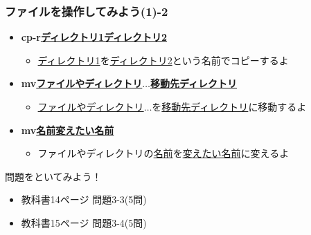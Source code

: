 \documentclass[slide03.tex]{subfiles}
\begin{document}
\begin{frame}
    \frametitle{ファイルを操作してみよう(1)-2}
    \begin{itemize}
        \item {\bf cp\textvisiblespace-r\textvisiblespace\underline{ディレクトリ1}\textvisiblespace\underline{ディレクトリ2}}
        \begin{itemize}
            \small
            \item[] \underline{ディレクトリ1}を\underline{ディレクトリ2}という名前でコピーするよ
        \end{itemize}
            \item {\bf mv\textvisiblespace\underline{ファイルやディレクトリ}$\ldots$\textvisiblespace\underline{移動先ディレクトリ}}
        \begin{itemize}
            \small
            \item[] \underline{ファイルやディレクトリ}$\ldots$を\underline{移動先ディレクトリ}に移動するよ
        \end{itemize}
        \item {\bf mv\textvisiblespace\underline{名前}\textvisiblespace\underline{変えたい名前}}
        \begin{itemize}
            \small
            \item[] ファイルやディレクトリの\underline{名前}を\underline{変えたい名前}に変えるよ
        \end{itemize}
    \end{itemize}
\end{frame}

\begin{frame}
    \begin{exampleblock}{問題をといてみよう！}
        \begin{itemize}
            \item 教科書14ページ 問題3-3(5問)
            \item 教科書15ページ 問題3-4(5問)
            \end{itemize}
    \end{exampleblock}
\end{frame}
\end{document}
